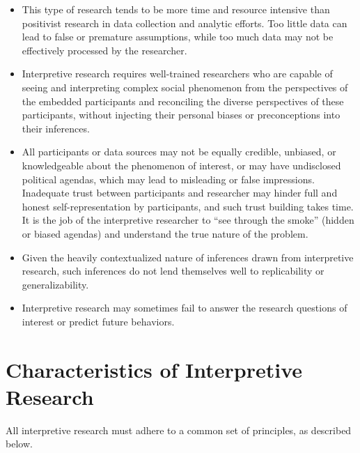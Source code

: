 \begin{itemize}
	\item This type of research tends to be more time and resource intensive than positivist research in data collection and analytic efforts. Too little data can lead to false or premature assumptions, while too much data may not be effectively processed by the researcher.
	\item Interpretive research requires well-trained researchers who are capable of seeing and interpreting complex social phenomenon from the perspectives of the embedded participants and reconciling the diverse perspectives of these participants, without injecting their personal biases or preconceptions into their inferences.
	\item All participants or data sources may not be equally credible, unbiased, or knowledgeable about the phenomenon of interest, or may have undisclosed political agendas, which may lead to misleading or false impressions. Inadequate trust between participants and researcher may hinder full and honest self-representation by participants, and such trust building takes time. It is the job of the interpretive researcher to ``see through the smoke'' (hidden or biased agendas) and understand the true nature of the problem.
	\item Given the heavily contextualized nature of inferences drawn from interpretive research, such inferences do not lend themselves well to replicability or generalizability. 
	\item Interpretive research may sometimes fail to answer the research questions of interest or predict future behaviors.
\end{itemize}

\section{Characteristics of Interpretive Research}

All interpretive research must adhere to a common set of principles, as described below.

